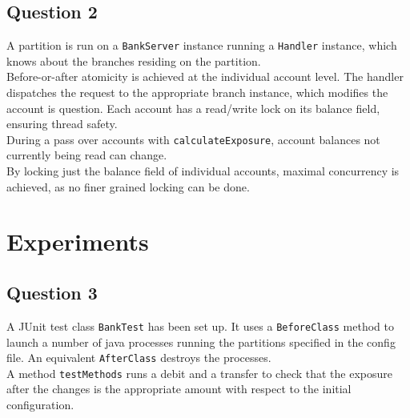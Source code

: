 \documentclass[12pt]{article}
\begin{document}
\subsection*{Question 2}
A partition is run on a \texttt{BankServer} instance running a \texttt{Handler} instance, which knows about the branches residing on the partition. \\
Before-or-after atomicity is achieved at the individual account level. The handler dispatches the request to the appropriate branch instance, which modifies the account is question. Each account has a read/write lock on its balance field, ensuring thread safety. \\
During a pass over accounts with \texttt{calculateExposure}, account balances not currently being read can change. \\
By locking just the balance field of individual accounts, maximal concurrency is achieved, as no finer grained locking can be done.
\section*{Experiments}

\subsection*{Question 3}
A JUnit test class \texttt{BankTest} has been set up. It uses a \texttt{BeforeClass} method to launch a number of java processes running the partitions specified in the config file. An equivalent \texttt{AfterClass} destroys the processes. \\
A method \texttt{testMethods} runs a debit and a transfer to check that the exposure after the changes is the appropriate amount with respect to the initial configuration.
\end{document}

